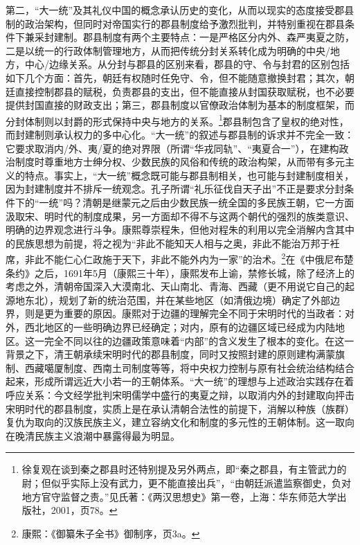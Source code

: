 \documentclass[a4paper, 12pt, openright]{ctexbook}
\begin{document}
第二，“大一统”及其礼仪中国的概念承认历史的变化，从而以现实的态度接受郡县制的政治架构，但同时对帝国实行的郡县制度给予激烈批判，并特别重视在郡县条件下兼采封建制。郡县制度有两个主要特点：一是严格区分内外、森严夷夏之防，二是以统一的行政体制管理地方，从而把传统分封关系转化成为明确的中央/地方，中心/边缘关系。从分封与郡县的区别来看，郡县的守、令与封君的区别包括如下几个方面：首先，朝廷有权随时任免守、令，但不能随意撤换封君；其次，朝廷直接控制郡县的赋税，负责郡县的支出，但不能直接从封国获取赋税，也不必要提供封国直接的财政支出；第三，郡县制度以官僚政治体制为基本的制度框架，而分封体制则以封爵的形式保持中央与地方的关系。\footnote{徐复观在谈到秦之郡县时还特别提及另外两点，即“秦之郡县，有主管武力的尉；但似乎实际上没有武力，更不能直接出兵”，“由朝廷派遣监察御史，负对地方官守监督之责。”见氏著：《两汉思想史》第一卷，上海：华东师范大学出版社，2001，页78。}郡县制包含了皇权的绝对性，而封建制则承认权力的多中心化。“大一统”的叙述与郡县制的诉求并不完全一致：它要求取消内/外、夷/夏的绝对界限（所谓“华戎同轨”、“夷夏合一”），在建构政治制度时尊重地方士绅分权、少数民族的风俗和传统的政治构架，从而带有多元主义的特点。事实上，“大一统”概念既可能与郡县制相关，也可能与封建制度相关，因为封建制度并不排斥一统观念。孔子所谓“礼乐征伐自天子出”不正是要求分封条件下的“一统”吗？清朝是继蒙元之后由少数民族一统全国的多民族王朝，它一方面汲取宋、明时代的制度成果，另一方面却不得不与这两个朝代的强烈的族类意识、明确的边界观念进行斗争。康熙尊崇程朱，但他对程朱的利用以完全消解内含其中的民族思想为前提，将之视为“非此不能知天人相与之奥，非此不能治万邦于衽席，非此不能仁心仁政施于天下，非此不能外内为一家”的治术。\footnote{康熙：《御纂朱子全书》御制序，页3a。}在《中俄尼布楚条约》之后，1691年5月（康熙三十年），康熙发布上谕，禁修长城，除了经济上的考虑之外，清朝帝国深入大漠南北、天山南北、青海、西藏（更不用说它自己的起源地东北），规划了新的统治范围，并在某些地区（如清俄边境）确定了外部边界，则是更为重要的原因。康熙对于边疆的理解完全不同于宋明时代的当政者：对外，西北地区的一些明确边界已经确定；对内，原有的边疆区域已经成为内陆地区。这一完全不同以往的边疆政策意味着“内部”的含义发生了根本的变化。在这一背景之下，清王朝承续宋明时代的郡县制度，同时又按照封建的原则建构满蒙旗制、西藏噶厦制度、西南土司制度等等，将中央权力控制与原有社会统治结构结合起来，形成所谓远近大小若一的王朝体系。“大一统”的理想与上述政治实践存在着呼应关系：今文经学批判宋明儒学中盛行的夷夏之辩，以取消内外的封建取向抨击宋明时代的郡县制度，实质上是在承认清朝合法性的前提下，消解以种族（族群）复仇为取向的汉族民族主义，建立容纳文化和制度的多元性的王朝体制。这一取向在晚清民族主义浪潮中暴露得最为明显。
\end{document}
